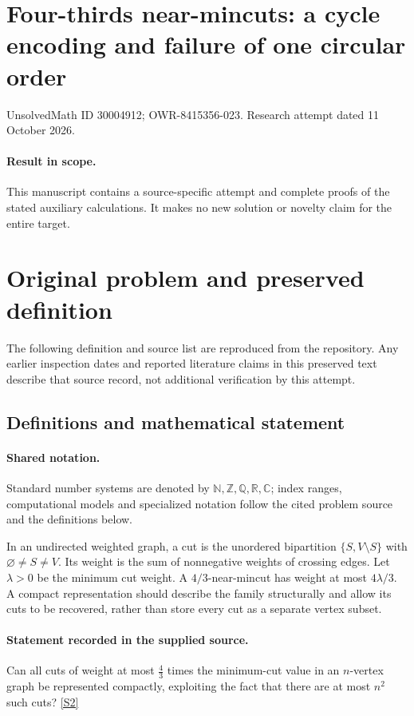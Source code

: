 \documentclass[11pt]{article}
\begin{document}
\section*{Four-thirds near-mincuts: a cycle encoding and failure of one circular order}
\noindent UnsolvedMath ID 30004912; OWR-8415356-023. Research attempt dated 11 October 2026.
\paragraph{Result in scope.}This manuscript contains a source-specific attempt and complete proofs of the stated auxiliary calculations. It makes no new solution or novelty claim for the entire target.
\section{Original problem and preserved definition}
The following definition and source list are reproduced from the repository. Any earlier inspection dates and reported literature claims in this preserved text describe that source record, not additional verification by this attempt.
\subsection{Definitions and mathematical statement}

\paragraph{Shared notation.}Standard number systems are denoted by $\mathbb N,\mathbb Z,\mathbb Q,\mathbb R,\mathbb C$; index ranges, computational models and specialized notation follow the cited problem source and the definitions below.


In an undirected weighted graph, a cut is the unordered bipartition $\{S,V\setminus S\}$ with $\varnothing\ne S\ne V$. Its weight is the sum of nonnegative weights of crossing edges. Let $\lambda>0$ be the minimum cut weight. A $4/3$-near-mincut has weight at most $4\lambda/3$. A compact representation should describe the family structurally and allow its cuts to be recovered, rather than store every cut as a separate vertex subset.
\paragraph{Statement recorded in the supplied source.}
Can all cuts of weight at most $\tfrac43$ times the minimum-cut value in an $n$-vertex graph be represented compactly, exploiting the fact that there are at most $n^2$ such cuts? \href{https://doi.org/10.4171/owr/2021/53}{[S2]}
\end{document}

